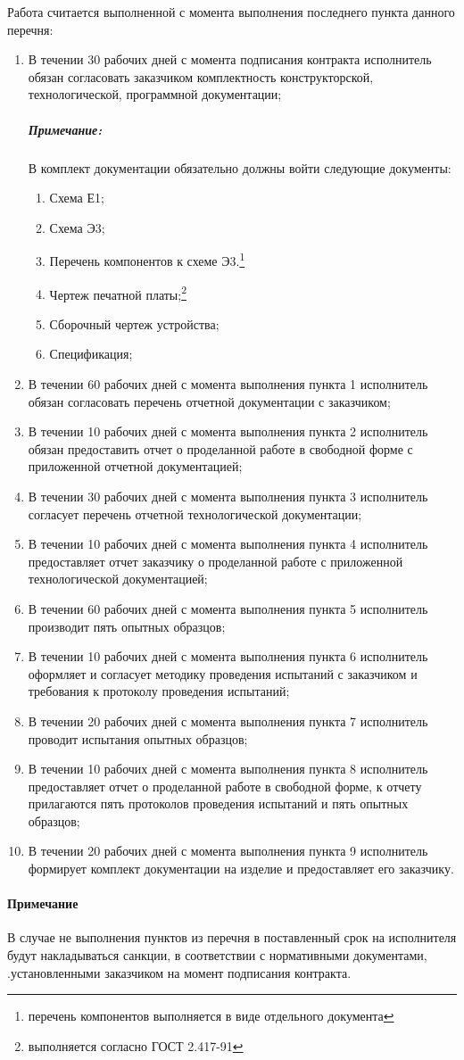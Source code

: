 Работа считается выполненной с момента выполнения последнего пункта данного перечня:

\begin{enumerate}
\item В течении 30 рабочих дней с момента подписания контракта исполнитель обязан согласовать заказчиком комплектность конструкторской, технологической, программной документации;
\subparagraph{Примечание:}
В комплект документации обязательно должны войти следующие документы:
    \begin{enumerate}
        \item Схема Е1;
        \item Схема Э3;
        \item Перечень компонентов к схеме Э3.\footnote{перечень компонентов выполняется в виде отдельного документа}
        \item Чертеж печатной платы;\footnote{выполняется согласно ГОСТ 2.417-91}
        \item Сборочный чертеж устройства;
        \item Спецификация;
    \end{enumerate}
\item В течении 60 рабочих дней с момента выполнения пункта 1 исполнитель обязан согласовать перечень отчетной документации с заказчиком;
\item В течении 10 рабочих дней с момента выполнения пункта 2 исполнитель обязан предоставить отчет о проделанной работе в свободной форме с приложенной отчетной документацией;
\item В течении 30 рабочих дней с момента выполнения пункта 3 исполнитель согласует перечень отчетной технологической документации;
\item В течении 10 рабочих дней с момента выполнения пункта 4 исполнитель предоставляет отчет заказчику о проделанной работе с приложенной технологической документацией;
\item В течении 60 рабочих дней с момента выполнения пункта 5 исполнитель производит пять опытных образцов;
\item В течении 10 рабочих дней с момента выполнения пункта 6 исполнитель оформляет и согласует методику проведения испытаний с заказчиком и требования к протоколу проведения испытаний;
\item В течении 20 рабочих дней с момента выполнения пункта 7 исполнитель проводит испытания опытных образцов;
\item В течении 10 рабочих дней с момента выполнения пункта 8 исполнитель предоставляет отчет о проделанной работе в свободной форме, к отчету прилагаются пять протоколов проведения испытаний и пять опытных образцов;
\item В течении 20 рабочих дней с момента выполнения пункта 9 исполнитель формирует комплект документации на изделие и предоставляет его заказчику.
\end{enumerate}

\paragraph{Примечание} 
В случае не выполнения пунктов из перечня в поставленный срок на исполнителя будут накладываться санкции, в соответствии с нормативными документами, .установленными заказчиком на момент подписания контракта.

